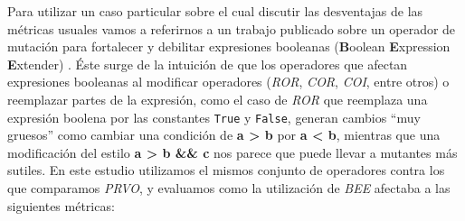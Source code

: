 Para utilizar un caso particular sobre el cual discutir las desventajas de las m\'etricas usuales vamos a referirnos a un trabajo publicado sobre un operador de mutaci\'on para fortalecer y debilitar expresiones booleanas (\textbf{B}oolean \textbf{E}xpression \textbf{E}xtender) \cite{bibliography.mutation.operators.beeBridaS17}. \'Este surge de la intuici\'on de que los operadores que afectan expresiones booleanas al modificar operadores (\emph{ROR}, \emph{COR}, \emph{COI}, entre otros) o reemplazar partes de la expresi\'on, como el caso de \emph{ROR} que reemplaza una expresi\'on boolena por las constantes \lstinline{True} y \lstinline{False}, generan cambios ``muy gruesos'' como cambiar una condici\'on de \textbf{a > b} por \textbf{a < b}, mientras que una modificaci\'on del estilo \textbf{a > b \&\& c} nos parece que puede llevar a mutantes m\'as sutiles. En este estudio utilizamos el mismos conjunto de operadores contra los que comparamos \emph{PRVO}, y evaluamos como la utilizaci\'on de \emph{BEE} afectaba a las siguientes m\'etricas:
